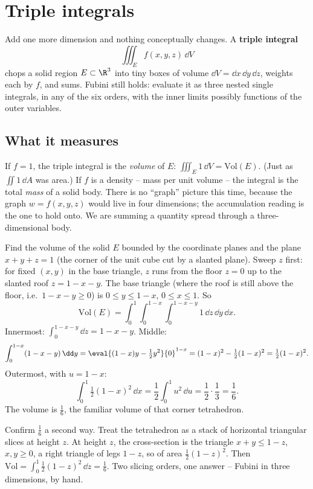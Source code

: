 \section{Triple integrals}
\label{ch34:triple}

Add one more dimension and nothing conceptually changes. A \textbf{triple
integral}
\[
  \iiint_E f(x,y,z)\,\dd V
\]
chops a solid region $E\subset\R^3$ into tiny boxes of volume
$\dd V=\dd x\,\dd y\,\dd z$, weights each by $f$, and sums. Fubini still holds:
evaluate it as three nested single integrals, in any of the six orders, with the
inner limits possibly functions of the outer variables.

\subsection{What it measures}

If $f=1$, the triple integral is the \emph{volume} of $E$:
$\iiint_E 1\,\dd V=\text{Vol}(E)$. (Just as $\iint 1\,\dd A$ was area.) If $f$ is
a density -- mass per unit volume -- the integral is the total \emph{mass} of a
solid body. There is no ``graph'' picture this time, because the graph
$w=f(x,y,z)$ would live in four dimensions; the accumulation reading is the one
to hold onto. We are summing a quantity spread through a three-dimensional body.

\begin{example}
\label{ch34:ex-tet}
Find the volume of the solid $E$ bounded by the coordinate planes and the plane
$x+y+z=1$ (the corner of the unit cube cut by a slanted plane). Sweep $z$ first:
for fixed $(x,y)$ in the base triangle, $z$ runs from the floor $z=0$ up to the
slanted roof $z=1-x-y$. The base triangle (where the roof is still above the
floor, i.e.\ $1-x-y\ge 0$) is $0\le y\le 1-x$, $0\le x\le 1$. So
\[
  \text{Vol}(E)=\int_0^1\!\int_0^{1-x}\!\int_0^{1-x-y} 1\,\dd z\,\dd y\,\dd x .
\]
Innermost: $\int_0^{1-x-y}\dd z=1-x-y$. Middle:
\[
  \int_0^{1-x}(1-x-y)\,\dd y
  =\eval{(1-x)y-\tfrac12 y^2}{0}^{1-x}
  =(1-x)^2-\tfrac12(1-x)^2=\tfrac12(1-x)^2 .
\]
Outermost, with $u=1-x$:
\[
  \int_0^1\tfrac12(1-x)^2\,\dd x=\frac12\int_0^1 u^2\,\dd u=\frac12\cdot\frac13=\frac16 .
\]
The volume is $\tfrac16$, the familiar volume of that corner tetrahedron.
\end{example}

\begin{labbox}
Confirm $\tfrac16$ a second way. Treat the tetrahedron as a stack of horizontal
triangular slices at height $z$. At height $z$, the cross-section is the triangle
$x+y\le 1-z$, $x,y\ge 0$, a right triangle of legs $1-z$, so of area
$\tfrac12(1-z)^2$. Then $\text{Vol}=\int_0^1\tfrac12(1-z)^2\,\dd z=\tfrac16$.
Two slicing orders, one answer -- Fubini in three dimensions, by hand.
\end{labbox}

